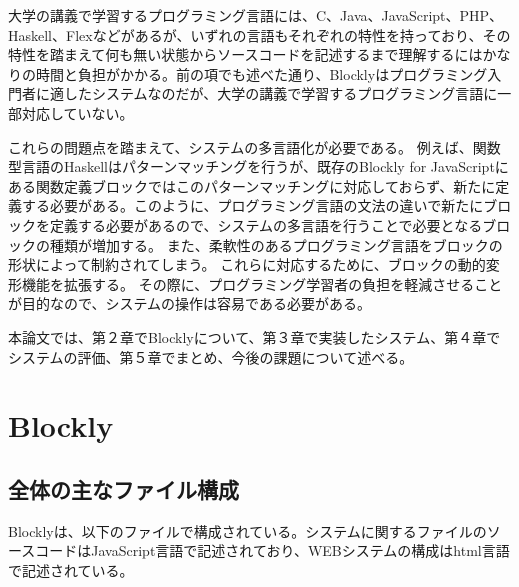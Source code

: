 \documentclass{eniepaper}
\begin{document}
大学の講義で学習するプログラミング言語には、C、Java、JavaScript、PHP、Haskell、Flexなどがあるが、いずれの言語もそれぞれの特性を持っており、その特性を踏まえて何も無い状態からソースコードを記述するまで理解するにはかなりの時間と負担がかかる。前の項でも述べた通り、Blocklyはプログラミング入門者に適したシステムなのだが、大学の講義で学習するプログラミング言語に一部対応していない。

これらの問題点を踏まえて、システムの多言語化が必要である。
例えば、関数型言語のHaskellはパターンマッチングを行うが、既存のBlockly for JavaScriptにある関数定義ブロックではこのパターンマッチングに対応しておらず、新たに定義する必要がある。このように、プログラミング言語の文法の違いで新たにブロックを定義する必要があるので、システムの多言語を行うことで必要となるブロックの種類が増加する。
また、柔軟性のあるプログラミング言語をブロックの形状によって制約されてしまう。
これらに対応するために、ブロックの動的変形機能を拡張する。
その際に、プログラミング学習者の負担を軽減させることが目的なので、システムの操作は容易である必要がある。

本論文では、第２章でBlocklyについて、第３章で実装したシステム、第４章でシステムの評価、第５章でまとめ、今後の課題について述べる。



   \chapter{Blockly}
   
   \section{全体の主なファイル構成}
   
Blocklyは、以下のファイルで構成されている。システムに関するファイルのソースコードはJavaScript言語で記述されており、WEBシステムの構成はhtml言語で記述されている。
   
\end{document}
